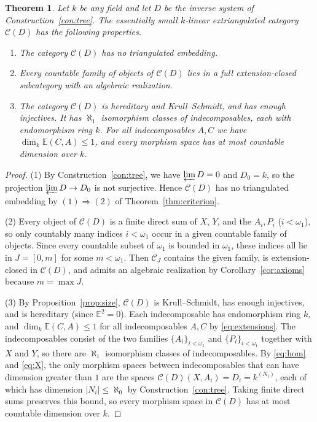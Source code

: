 \documentclass[a4paper,reqno,10pt]{amsart}
\numberwithin{equation}{section}
\newtheorem{theorem}{Theorem}[section]
\theoremstyle{definition}
\newcommand{\C}{\mathcal C}
\newcommand{\E}{\mathbb E}
\begin{document}
\begin{theorem}\label{thm:example}
Let $k$ be any field and let $D$ be the inverse system of
Construction~\ref{con:tree}. The essentially small $k$-linear extriangulated
category $\C(D)$ has the following properties.
\begin{enumerate}
\item The category $\C(D)$ has no triangulated embedding.
\item Every countable family of objects of $\C(D)$ lies in a full
extension-closed subcategory with an algebraic realization.
\item The category $\C(D)$ is hereditary and Krull--Schmidt, and has enough
injectives. It has $\aleph_1$ isomorphism classes of indecomposables, each with
endomorphism ring $k$. For all indecomposables $A,C$ we have
$\dim_k\E(C,A)\le1$, and every morphism space has at most countable dimension
over $k$.
\end{enumerate}
\end{theorem}
\begin{proof}
(1) By Construction~\ref{con:tree}, we have $\varprojlim D=0$ and $D_0=k$, so
the projection $\varprojlim D\to D_0$ is not surjective. Hence $\C(D)$ has no
triangulated embedding by $(1)\Rightarrow(2)$ of Theorem~\ref{thm:criterion}.

(2) Every object of $\C(D)$ is a finite direct sum of $X$, $Y$, and the
$A_i,P_i$ ($i<\omega_1$), so only countably many indices $i<\omega_1$ occur in
a given countable family of objects. Since every countable subset of $\omega_1$
is bounded in $\omega_1$, these indices all lie in $J=[0,m]$ for some
$m<\omega_1$. Then $\C_J$ contains the given family, is extension-closed in
$\C(D)$, and admits an algebraic realization by Corollary~\ref{cor:axioms}
because $m=\max J$.

(3) By Proposition~\ref{prop:size}, $\C(D)$ is Krull--Schmidt, has enough
injectives, and is hereditary (since $\E^2=0$). Each indecomposable has
endomorphism ring $k$, and $\dim_k\E(C,A)\le1$ for all indecomposables $A,C$ by
\eqref{eq:extensions}. The indecomposables consist of the two families
$\{A_i\}_{i<\omega_1}$ and $\{P_i\}_{i<\omega_1}$ together with $X$ and $Y$, so
there are $\aleph_1$ isomorphism classes of indecomposables. By \eqref{eq:hom}
and \eqref{eq:X}, the only morphism spaces between indecomposables that can
have dimension greater than $1$ are the spaces $\C(D)(X,A_i)=D_i=k^{(N_i)}$,
each of which has dimension $|N_i|\le\aleph_0$ by Construction~\ref{con:tree}.
Taking finite direct sums preserves this bound, so every morphism space in
$\C(D)$ has at most countable dimension over $k$.
\end{proof}
\end{document}

